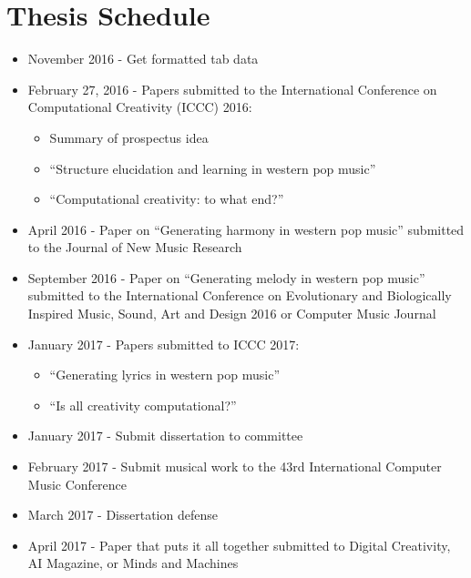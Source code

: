 \documentclass[11pt,phd]{byuprop}
\begin{document}
\section{Thesis Schedule}
\begin{itemize}
\item{November 2016 - Get formatted tab data}
\item{February 27, 2016 - Papers submitted to the International Conference on Computational Creativity (ICCC) 2016:}
\begin{itemize}
\item{Summary of prospectus idea}
\item{``Structure elucidation and learning in western pop music''}
\item{``Computational creativity: to what end?''}
\end{itemize}
\item{April 2016 - Paper on ``Generating harmony in western pop music'' submitted to the Journal of New Music Research}
\item{September 2016 - Paper on ``Generating melody in western pop music'' submitted to the International Conference on Evolutionary and Biologically Inspired Music, Sound, Art and Design 2016 or Computer Music Journal}
\item{January 2017 - Papers submitted to ICCC 2017:}
\begin{itemize}
\item{``Generating lyrics in western pop music''}
\item{``Is all creativity computational?''}
\end{itemize}
\item{January 2017 - Submit dissertation to committee}
\item{February 2017 - Submit musical work to the 43rd International Computer Music Conference}
\item{March 2017 - Dissertation defense}
\item{April 2017 - Paper that puts it all together submitted to Digital Creativity, AI Magazine, or Minds and Machines}
\end{itemize}




\end{document}
